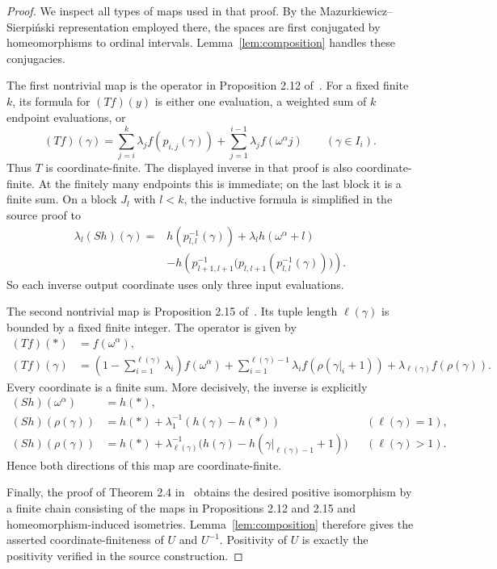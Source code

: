 \documentclass[11pt]{article}
\begin{document}
\begin{proof}
We inspect all types of maps used in that proof.  By the
Mazurkiewicz--Sierpiński representation employed there, the spaces are first
conjugated by homeomorphisms to ordinal intervals.  Lemma~\ref{lem:composition}
handles these conjugacies.

The first nontrivial map is the operator in Proposition 2.12 of~\cite{CHRS}.
For a fixed finite $k$, its formula for $(Tf)(y)$ is either one evaluation, a
weighted sum of $k$ endpoint evaluations, or
\[
 (Tf)(\gamma)=\sum_{j=i}^k\lambda_j f(p_{i,j}(\gamma))
   +\sum_{j=1}^{i-1}\lambda_j f(\omega^\alpha j)
       \qquad(\gamma\in I_i).
\]
Thus $T$ is coordinate-finite.  The displayed inverse in that proof is also
coordinate-finite.  At the finitely many endpoints this is immediate; on the
last block it is a finite sum.  On a block $J_l$ with $l<k$, the inductive
formula is simplified in the source proof to
\begin{align}\label{eq:first-inverse}
 \lambda_l(Sh)(\gamma)
  ={}&h(p_{l,l}^{-1}(\gamma))+\lambda_l h(\omega^\alpha+l)\\
    &-h\!\left(p_{l+1,l+1}^{-1}
       \bigl(p_{l,l+1}(p_{l,l}^{-1}(\gamma))\bigr)\right).\nonumber
\end{align}
So each inverse output coordinate uses only three input evaluations.

The second nontrivial map is Proposition 2.15 of~\cite{CHRS}.  Its tuple
length $\ell(\gamma)$ is bounded by a fixed finite integer.  The operator is
given by
\begin{align}\label{eq:second-forward}
 (Tf)(*)&=f(\omega^\alpha),\nonumber\\
 (Tf)(\gamma)
 &=\left(1-\sum_{i=1}^{\ell(\gamma)}\lambda_i\right)f(\omega^\alpha)
  +\sum_{i=1}^{\ell(\gamma)-1}\lambda_i
       f(\rho(\gamma|_i+1))
  +\lambda_{\ell(\gamma)}f(\rho(\gamma)).
\end{align}
Every coordinate is a finite sum.  More decisively, the inverse is explicitly
\begin{align}\label{eq:second-inverse}
 (Sh)(\omega^\alpha)&=h(*),\nonumber\\
 (Sh)(\rho(\gamma))
 &=h(*)+\lambda_1^{-1}(h(\gamma)-h(*))
       &&(\ell(\gamma)=1),\nonumber\\
 (Sh)(\rho(\gamma))
 &=h(*)+\lambda_{\ell(\gamma)}^{-1}
   \bigl(h(\gamma)-h(\gamma|_{\ell(\gamma)-1}+1)\bigr)
       &&(\ell(\gamma)>1).
\end{align}
Hence both directions of this map are coordinate-finite.

Finally, the proof of Theorem 2.4 in~\cite{CHRS} obtains the desired positive
isomorphism by a finite chain consisting of the maps in Propositions 2.12 and
2.15 and homeomorphism-induced isometries.  Lemma~\ref{lem:composition}
therefore gives the asserted coordinate-finiteness of $U$ and $U^{-1}$.
Positivity of $U$ is exactly the positivity verified in the source
construction.
\end{proof}
\end{document}
